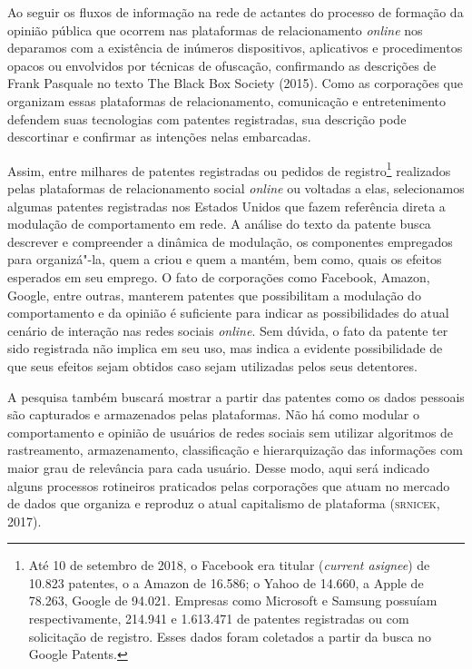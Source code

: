Ao seguir os fluxos de informação na rede de actantes do processo de
formação da opinião pública que ocorrem nas plataformas de
relacionamento \textit{online} nos deparamos com a existência de inúmeros
dispositivos, aplicativos e procedimentos opacos ou envolvidos por
técnicas de ofuscação, confirmando as descrições de Frank Pasquale no
texto The Black Box Society (2015). Como as corporações que organizam
essas plataformas de relacionamento, comunicação e entretenimento
defendem suas tecnologias com patentes registradas, sua descrição pode
descortinar e confirmar as intenções nelas embarcadas.

Assim, entre milhares de patentes registradas ou pedidos de
registro\footnote{Até 10 de setembro de 2018, o Facebook era titular
  (\textit{current asignee}) de 10.823 patentes, o a Amazon de 16.586; o Yahoo de
  14.660, a Apple de 78.263, Google de 94.021. Empresas como Microsoft e
  Samsung possuíam respectivamente, 214.941 e 1.613.471 de patentes
  registradas ou com solicitação de registro. Esses dados foram coletados a partir da busca no Google Patents.}
realizados pelas plataformas de relacionamento social \textit{online} ou
voltadas a elas, selecionamos algumas patentes registradas nos Estados
Unidos que fazem referência direta a modulação de comportamento em rede.
A análise do texto da patente busca descrever e compreender a dinâmica
de modulação, os componentes empregados para organizá"-la, quem a criou e
quem a mantém, bem como, quais os efeitos esperados em seu emprego. O
fato de corporações como Facebook, Amazon, Google, entre outras,
manterem patentes que possibilitam a modulação do comportamento e da
opinião é suficiente para indicar as possibilidades do atual cenário de
interação nas redes sociais \textit{online}. Sem dúvida, o fato da patente ter
sido registrada não implica em seu uso, mas indica a evidente
possibilidade de que seus efeitos sejam obtidos caso sejam utilizadas
pelos seus detentores.

A pesquisa também buscará mostrar a partir das patentes como os dados
pessoais são capturados e armazenados pelas plataformas. Não há como
modular o comportamento e opinião de usuários de redes sociais sem
utilizar algoritmos de rastreamento, armazenamento, classificação e
hierarquização das informações com maior grau de relevância para cada
usuário. Desse modo, aqui será indicado alguns processos rotineiros
praticados pelas corporações que atuam no mercado de dados que organiza
e reproduz o atual capitalismo de plataforma (\textsc{srnicek}, 2017).

